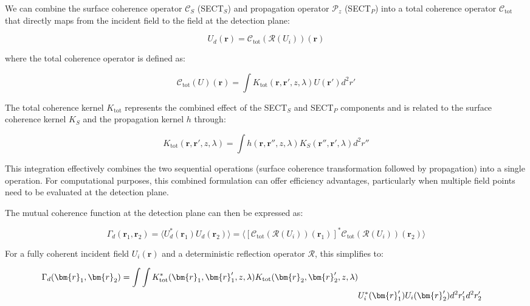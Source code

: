 \documentclass[a4paper,12pt]{article}
\begin{document}
We can combine the surface coherence operator $\mathcal{C}_S$ (SECT$_S$) and propagation operator $\mathcal{P}_z$ (SECT$_P$) into a total coherence operator $\mathcal{C}_{\text{tot}}$ that directly maps from the incident field to the field at the detection plane:

\begin{equation}
U_d(\bm{r}) = \mathcal{C}_{\text{tot}}(\mathcal{R}(U_i))(\bm{r})
\end{equation}

where the total coherence operator is defined as:

\begin{equation}
\mathcal{C}_{\text{tot}}(U)(\bm{r}) = \int K_{\text{tot}}(\bm{r}, \bm{r}', z, \lambda) U(\bm{r}') d^2r'
\end{equation}

The total coherence kernel $K_{\text{tot}}$ represents the combined effect of the SECT$_S$ and SECT$_P$ components and is 
related to 
the surface coherence kernel $K_S$ and the propagation kernel $h$ through:

\begin{equation}
K_{\text{tot}}(\bm{r}, \bm{r}', z, \lambda) = \int h(\bm{r}, \bm{r}'', z, \lambda) K_S(\bm{r}'', \bm{r}', \lambda) d^2r''
\end{equation}

This integration effectively combines the two sequential operations (surface coherence transformation followed by propagation) into a single operation. For computational purposes, this combined formulation can offer efficiency advantages, particularly when multiple field points need to be evaluated at the detection plane.

The mutual coherence function at the detection plane can then be expressed as:

\begin{equation}
\Gamma_d(\bm{r}_1, \bm{r}_2) = \langle U_d^*(\bm{r}_1) U_d(\bm{r}_2) \rangle = \langle [\mathcal{C}_{\text{tot}}(\mathcal{R}(U_i))(\bm{r}_1)]^* \mathcal{C}_{\text{tot}}(\mathcal{R}(U_i))(\bm{r}_2) \rangle
\end{equation}

For a fully coherent incident field $U_i(\bm{r})$ and a deterministic reflection operator $\mathcal{R}$, this simplifies to:

\begin{align}
\Gamma_d(\bm{r}_1, \bm{r}_2) = \int\int K_{\text{tot}}^*(\bm{r}_1, \bm{r}'_1, z, \lambda) K_{\text{tot}}(\bm{r}_2, \bm{r}'_2, z, \lambda) \\
&U_i^*(\bm{r}'_1) U_i(\bm{r}'_2) d^2r'_1 d^2r'_2 \notag
\end{align}
\end{document}
